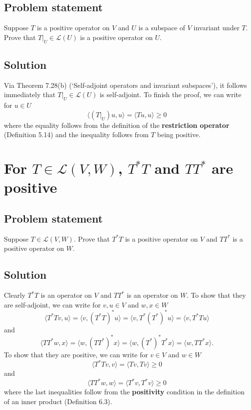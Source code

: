 \documentclass{article}
\begin{document}
\subsection*{Problem statement}
Suppose $T$ is a positive operator on $V$ and $U$ is a subspace of $V$ invariant under $T$. Prove that $T|_U\in\mathcal{L}(U)$ is a positive operator on $U$.

\subsection*{Solution}
Via Theorem 7.28(b) (`Self-adjoint operators and invariant subspaces'), it follows immediately that $T|_U\in\mathcal{L}(U)$ is self-adjoint. To finish the proof, we can write for $u\in U$
\[\langle (T|_U)u,u\rangle=\langle Tu,u\rangle\geq 0\]
where the equality follows from the definition of the \textbf{restriction operator} (Definition 5.14) and the inequality follows from $T$ being positive.

\clearpage

\section{For $T\in\mathcal{L}(V,W)$, $T^*T$ and $TT^*$ are positive}
\subsection*{Problem statement}
Suppose $T\in\mathcal{L}(V,W)$. Prove that $T^*T$ is a positive operator on $V$ and $TT^*$ is a positive operator on $W$.

\subsection*{Solution}
Clearly $T^*T$ is an operator on $V$ and $TT^*$ is an operator on $W$. To show that they are self-adjoint, we can write for $v,u\in V$ and $w,x\in W$
\[\langle T^*Tv,u\rangle=\langle v,(T^*T)^*u\rangle=\langle v,T^*(T^*)^*u\rangle=\langle v,T^*Tu\rangle\]
and
\[\langle TT^*w,x\rangle=\langle w,(TT^*)^*x\rangle=\langle w,(T^*)^*T^*x\rangle=\langle w,TT^*x\rangle.\]
To show that they are positive, we can write for $v\in V$ and $w\in W$
\[\langle T^*Tv,v\rangle=\langle Tv,Tv\rangle\geq 0\]
and
\[\langle TT^*w,w\rangle=\langle T^*v,T^*v\rangle\geq 0\]
where the last inequalities follow from the \textbf{positivity} condition in the definition of an inner product (Definition 6.3).

\clearpage
\end{document}
